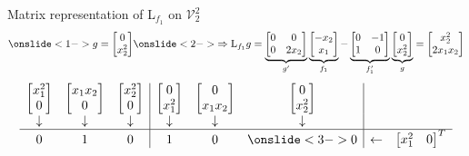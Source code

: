 \documentclass[10pt,T]{beamer}
\begin{document}
\begin{frame}[b]{Matrix representation of L$_{f_1}$ on $\mathcal{V}_2^2$}
\begin{equation*}
  \onslide<1->{g=\begin{bmatrix}0\\x_2^2\end{bmatrix}}
  \onslide<2->{\Rightarrow\text{L}_{f_1}g=\underbrace{\begin{bmatrix}0&0\\0&2x_2\end{bmatrix}}_{g'}\underbrace{\begin{bmatrix}-x_2\\x_1\end{bmatrix}}_{f_1}
    -\underbrace{\begin{bmatrix}0&-1\\1&0\end{bmatrix}}_{f_1'}\underbrace{\begin{bmatrix}0\\x_2^2\end{bmatrix}}_{g}=\begin{bmatrix}x_2^2\\2x_1x_2\end{bmatrix}}
\end{equation*}
\begin{equation*}
  \begin{array}{ccc|ccc|cc}
    \begin{bmatrix}x_1^2\\0\end{bmatrix}&\begin{bmatrix}x_1x_2\\0\end{bmatrix}&\begin{bmatrix}x_2^2\\0\end{bmatrix}&\begin{bmatrix}0\\x_1^2\end{bmatrix}&\begin{bmatrix}0\\x_1x_2\end{bmatrix}&\begin{bmatrix}0\\x_2^2\end{bmatrix}&&\\
    \downarrow&\downarrow&\downarrow&\downarrow&\downarrow&\downarrow&&\\\hline
    0&1&0&1&0&\onslide<3->{0}&\leftarrow&\begin{bmatrix}x_1^2&0\end{bmatrix}^T\\

\end{array}
\end{equation*}
\end{frame}
\end{document}
